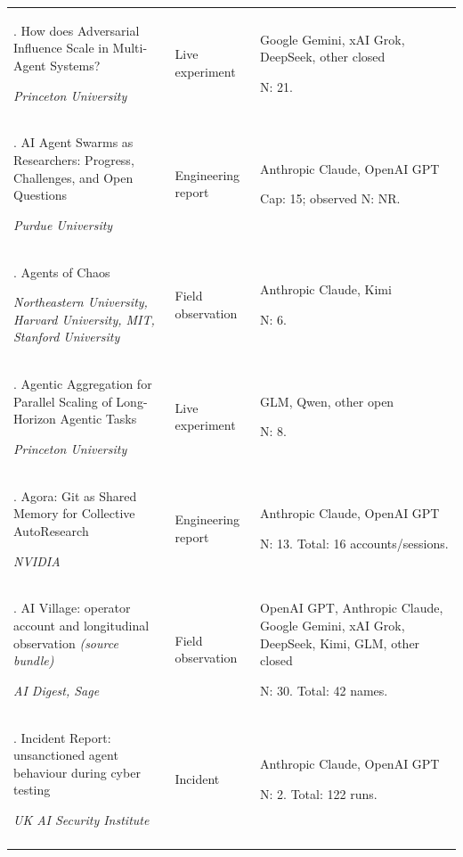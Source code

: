 \begin{longtable}{@{}>{\raggedright\arraybackslash}p{}>{\raggedright\arraybackslash}p{}>{\raggedright\arraybackslash}p{}@{}}
33. How does Adversarial Influence Scale in Multi-Agent Systems? \citep{adversarial-influence-scale}\par\emph{Princeton University} & Live experiment & Google Gemini, xAI Grok, DeepSeek, other closed\par N: 21. \\ \addlinespace[2pt]
34. AI Agent Swarms as Researchers: Progress, Challenges, and Open Questions \citep{agent-swarms-as-researchers}\par\emph{Purdue University} & Engineering report & Anthropic Claude, OpenAI GPT\par Cap: 15; observed N: NR. \\ \addlinespace[2pt]
35. Agents of Chaos \citep{agents-of-chaos}\par\emph{Northeastern University, Harvard University, MIT, Stanford University} & Field observation & Anthropic Claude, Kimi\par N: 6. \\ \addlinespace[2pt]
36. Agentic Aggregation for Parallel Scaling of Long-Horizon Agentic Tasks \citep{aggagent}\par\emph{Princeton University} & Live experiment & GLM, Qwen, other open\par N: 8. \\ \addlinespace[2pt]
37. Agora: Git as Shared Memory for Collective AutoResearch \citep{agora-git-memory}\par\emph{NVIDIA} & Engineering report & Anthropic Claude, OpenAI GPT\par N: 13. Total: 16 accounts/sessions. \\ \addlinespace[2pt]
38. AI Village: operator account and longitudinal observation \emph{(source bundle)} \citep{ai-village-how-it-works,ai-village-longitudinal}\par\emph{AI Digest, Sage} & Field observation & OpenAI GPT, Anthropic Claude, Google Gemini, xAI Grok, DeepSeek, Kimi, GLM, other closed\par N: 30. Total: 42 names. \\ \addlinespace[2pt]
39. Incident Report: unsanctioned agent behaviour during cyber testing \citep{aisi-incident-july-2026}\par\emph{UK AI Security Institute} & Incident & Anthropic Claude, OpenAI GPT\par N: 2. Total: 122 runs. \\ \addlinespace[2pt]

\end{longtable}

